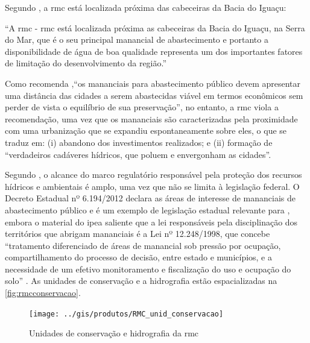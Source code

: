 	Segundo , a \gls{rmc} está localizada próxima das cabeceiras da Bacia do Iguaçu:
	
	\begin{citacao}
		``A \glsdesc{rmc} - \gls{rmc} está localizada próxima as cabeceiras da Bacia do Iguaçu, na Serra do Mar, que é o seu principal manancial de abastecimento e portanto a disponibilidade de água de boa qualidade representa um dos importantes fatores de limitação do desenvolvimento da região.''
	\end{citacao}

	Como recomenda ,``os mananciais para abastecimento público devem apresentar uma distância das cidades a serem abastecidas viável em termos econômicos sem perder de vista o equilíbrio de sua preservação'', no entanto, a \gls{rmc} viola a recomendação, uma vez que os mananciais são caracterizadas pela proximidade com uma urbanização que se expandiu espontaneamente sobre eles, o que se traduz em: (i) abandono dos investimentos realizados; e (ii) formação de ``verdadeiros cadáveres hídricos, que poluem e envergonham as cidades''.
	
	Segundo , o alcance do marco regulatório responsável pela proteção dos recursos hídricos e ambientais é amplo, uma vez que não se limita à legislação federal. O Decreto Estadual nº 6.194/2012 declara as áreas de interesse de mananciais de abastecimento público e é um exemplo de legislação estadual relevante para \cite[p. 30]{comec2019b}, embora o material do \gls{ipea} saliente que a lei responsáveis pela disciplinação dos territórios que abrigam mananciais é a Lei nº 12.248/1998, que concebe ``tratamento diferenciado de áreas de manancial sob pressão por ocupação, compartilhamento do processo de decisão, entre estado e municípios, e a necessidade de um efetivo monitoramento e fiscalização do uso e ocupação do solo'' . As unidades de conservação e a hidrografia estão espacializadas na \autoref{fig:rmcconservacao}.
	
	\begin{landscape}
		\begin{figure}
			\centering
			\caption{Unidades de conservação e hidrografia da \glsdesc{rmc}}
			\label{fig:rmcconservacao}
			\texttt{[image: ../gis/produtos/RMC\_unid\_conservacao]}
		\end{figure}
	\end{landscape}

